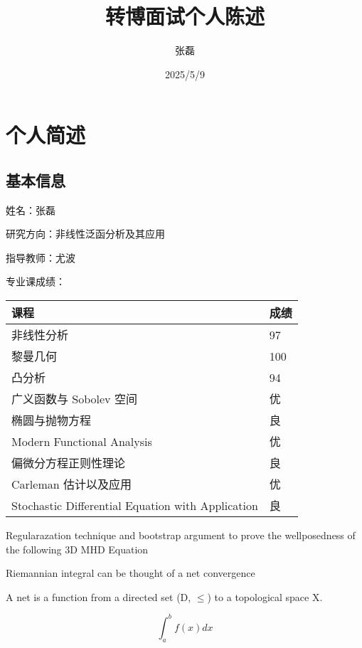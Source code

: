 \documentclass{beamer}
\title{转博面试个人陈述}
\author{张磊}
\institute{西安交通大学数学学院}
\date{2025/5/9}
\begin{document}

\section{个人简述}
\subsection{基本信息}

\begin{frame}
姓名：张磊

研究方向：非线性泛函分析及其应用

指导教师：尤波

专业课成绩：
\begin{tabular}{|l|l|}

\hline 课程 & 成绩 \\
\hline 非线性分析 & 97\\
\hline  黎曼几何 & 100  \\
\hline 凸分析 & 94 \\
\hline 广义函数与 Sobolev 空间 & 优 \\
\hline 椭圆与抛物方程 & 良 \\
\hline Modern Functional Analysis & 优   \\
\hline 偏微分方程正则性理论 & 良  \\
\hline Carleman 估计以及应用 & 优 \\
\hline Stochastic Differential Equation with Application & 良 \\
\hline
\end{tabular}

\end{frame}

\begin{frame}
    Regularazation technique and bootstrap argument to prove the wellposedness
    of the following 3D MHD Equation

    Riemannian integral can be thought of a net convergence

    \begin{definition}
        A net is a function from a directed set (D, $\leq$) to a topological space
        X.
    \end{definition}
    \begin{equation}
        \int_{a}^{b}f(x)dx
    \end{equation}


\end{frame}
\end{document}
